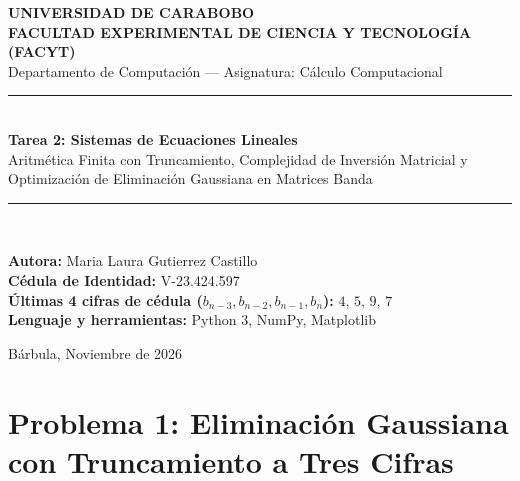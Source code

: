 \documentclass[11pt,letterpaper]{article}
\begin{document}
\begin{titlepage}
    \centering
    {\large \textbf{UNIVERSIDAD DE CARABOBO}}\\[0.15cm]
    {\large \textbf{FACULTAD EXPERIMENTAL DE CIENCIA Y TECNOLOGÍA (FACYT)}}\\[0.15cm]
    {\normalsize Departamento de Computación --- Asignatura: Cálculo Computacional}\\[2.2cm]

    \rule{\linewidth}{0.5mm}\\[0.4cm]
    {\LARGE \textbf{Tarea 2: Sistemas de Ecuaciones Lineales}}\\[0.3cm]
    {\large Aritmética Finita con Truncamiento, Complejidad de Inversión Matricial y Optimización de Eliminación Gaussiana en Matrices Banda}\\[0.2cm]
    \rule{\linewidth}{0.5mm}\\[2.0cm]

    \begin{flushleft}
        \hspace{2.2cm}\textbf{Autora:} Maria Laura Gutierrez Castillo \\
        \hspace{2.2cm}\textbf{Cédula de Identidad:} V-23.424.597 \\
        \hspace{2.2cm}\textbf{Últimas 4 cifras de cédula ($b_{n-3}, b_{n-2}, b_{n-1}, b_n$):} $4,\, 5,\, 9,\, 7$ \\
        \hspace{2.2cm}\textbf{Lenguaje y herramientas:} Python 3, NumPy, Matplotlib
    \end{flushleft}

    \vfill
    {\normalsize Bárbula, Noviembre de 2026}
\end{titlepage}

\tableofcontents
\newpage

\section{Problema 1: Eliminación Gaussiana con Truncamiento a Tres Cifras}
\end{document}
